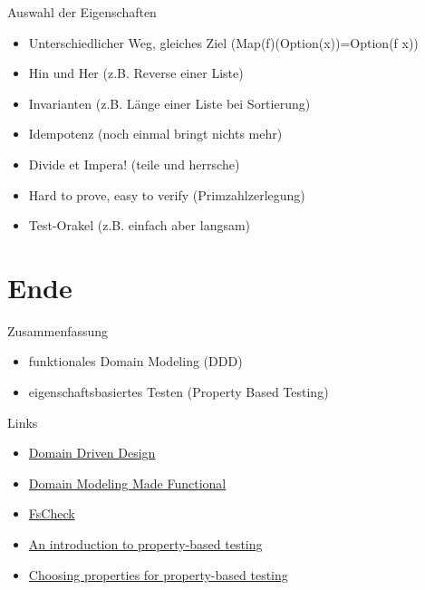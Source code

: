 \documentclass[t]{beamer}
\begin{document}
\begin{frame}[label={sec:org0695c8f}]{Auswahl der Eigenschaften}
\begin{itemize}
\item Unterschiedlicher Weg, gleiches Ziel (Map(f)(Option(x))=Option(f x))
\item Hin und Her (z.B. Reverse einer Liste)
\item Invarianten (z.B. Länge einer Liste bei Sortierung)
\item Idempotenz (noch einmal bringt nichts mehr)
\item Divide et Impera! (teile und herrsche)
\item Hard to prove, easy to verify (Primzahlzerlegung)
\item Test-Orakel (z.B. einfach aber langsam)
\end{itemize}
\end{frame}

\section{Ende }
\label{sec:org3fd273b}
\begin{frame}[label={sec:orgefcd6f1}]{Zusammenfassung}
\begin{itemize}
\item funktionales Domain Modeling (DDD)
\item eigenschaftsbasiertes Testen (Property Based Testing)
\end{itemize}
\end{frame}

\begin{frame}[label={sec:org2206560}]{Links}
\begin{itemize}
\item \href{https://fsharpforfunandprofit.com/ddd/}{Domain Driven Design}
\item \href{https://fsharpforfunandprofit.com/books/}{Domain Modeling Made Functional}
\item \href{https://github.com/fscheck/FsCheck}{FsCheck}
\item \href{https://fsharpforfunandprofit.com/posts/property-based-testing/}{An introduction to property-based testing}
\item \href{https://fsharpforfunandprofit.com/posts/property-based-testing-2/}{Choosing properties for property-based testing}
\end{itemize}
\end{frame}
\end{document}

